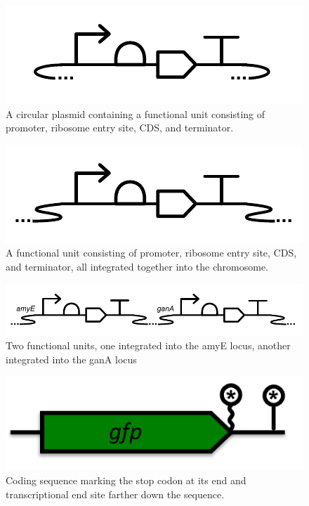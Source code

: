 \begin{figure}[h!]
\includegraphics[scale=1.0]{figures/apdx-examples/apdx-exa16-circular-plasmid-example.pdf}
\caption{A circular plasmid containing a functional unit consisting of promoter, ribosome entry site, CDS, and terminator.}\label{f:apdx:exa16}
\end{figure}

\begin{figure}[h!]
\includegraphics[scale=1.0]{figures/apdx-examples/apdx-exa17-chromosomal-locus-example.pdf}
\caption{A functional unit consisting of promoter, ribosome entry site, CDS, and terminator, all integrated together into the chromosome.}
\label{f:apdx:exa17}
\end{figure}

\begin{figure}[h!]
\includegraphics[scale=1.0]{figures/apdx-examples/apdx-exa18-chromosomal-locus-example2.pdf}
\caption{Two functional units, one integrated into the amyE locus, another integrated into the ganA locus}\label{f:apdx:exa18}
\end{figure}

\begin{figure}[h!]
\includegraphics[scale=0.5]{figures/apdx-examples/apdx-exa19-stop-sites.pdf}
\caption{Coding sequence marking the stop codon at its end and transcriptional end site farther down the sequence.}
\label{f:apdx:exa19}
\end{figure}

